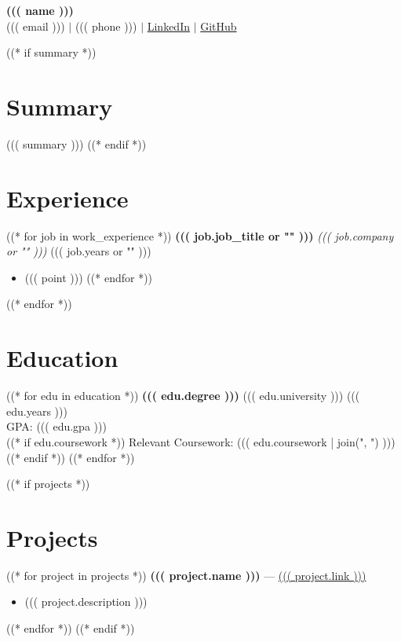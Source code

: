 \documentclass[a4paper,10pt]{article}
\begin{document}
\begin{center}
    {\LARGE \textbf{((( name )))}}\\
    ((( email ))) $|$ ((( phone ))) $|$ \href{((( linkedin )))}{LinkedIn} $|$ \href{((( github )))}{GitHub}
\end{center}

((* if summary *))
\section*{Summary}
((( summary )))
((* endif *))

\section*{Experience}
((* for job in work_experience *))
\textbf{((( job.job_title or "" )))}
\hfill 
\textit{((( job.company or "" )))}
\hfill 
((( job.years or "" )))\\
\begin{itemize}[leftmargin=1.5em]
((* for point in job.bullet_points or [] *))
    \item ((( point )))
((* endfor *))
\end{itemize}
((* endfor *))


\section*{Education}
((* for edu in education *))
\textbf{((( edu.degree )))} \hfill ((( edu.university ))) \hfill ((( edu.years )))\\
GPA: ((( edu.gpa )))\\
((*  if edu.coursework *))
Relevant Coursework: ((( edu.coursework | join(", ") )))
((* endif *))
((* endfor *))

((* if projects *))
\section*{Projects}
((* for project in projects *))
\textbf{((( project.name )))} --- \href{((( project.link )))}{((( project.link )))}
\begin{itemize}[leftmargin=1.5em]
    \item ((( project.description )))
\end{itemize}
((* endfor *))
((* endif *))
\end{document}

